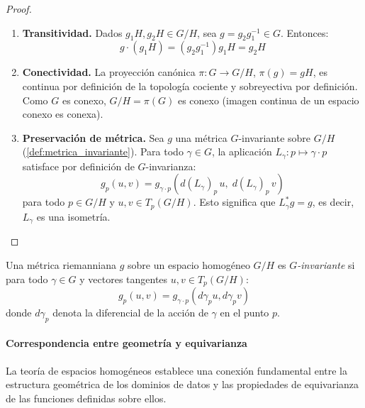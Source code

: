\begin{proof}
\leavevmode
\begin{enumerate}
    \item \textbf{Transitividad.} Dados $g_1H, g_2H \in G/H$, sea $g = g_2 g_1^{-1} \in G$. Entonces:
    \[
    g \cdot (g_1H) = (g_2 g_1^{-1}) g_1 H = g_2 H
    \]

    \item \textbf{Conectividad.} La proyección canónica $\pi: G \to G/H$, $\pi(g) = gH$, es continua por definición de la topología cociente y sobreyectiva por definición. Como $G$ es conexo, $G/H = \pi(G)$ es conexo (imagen continua de un espacio conexo es conexa).

    \item \textbf{Preservación de métrica.} Sea $g$ una métrica $G$-invariante sobre $G/H$ (\autoref{def:metrica_invariante}). Para todo $\gamma \in G$, la aplicación $L_\gamma: p \mapsto \gamma \cdot p$ satisface por definición de $G$-invarianza:
    \[
    g_p(u, v) = g_{\gamma \cdot p}(d(L_\gamma)_p\, u,\; d(L_\gamma)_p\, v)
    \]
    para todo $p \in G/H$ y $u, v \in T_p(G/H)$. Esto significa que $L_\gamma^* g = g$, es decir, $L_\gamma$ es una isometría. \qedhere
\end{enumerate}
\end{proof}

\begin{definition}\label{def:metrica_invariante}
Una métrica riemanniana $g$ sobre un espacio homogéneo $G/H$ es \textit{$G$-invariante} si para todo $\gamma \in G$ y vectores tangentes $u, v \in T_p(G/H)$:
\begin{equation}
g_p(u, v) = g_{\gamma \cdot p}(d\gamma_p u, d\gamma_p v)
\end{equation}
donde $d\gamma_p$ denota la diferencial de la acción de $\gamma$ en el punto $p$.
\end{definition}

\paragraph{Correspondencia entre geometría y equivarianza}

La teoría de espacios homogéneos establece una conexión fundamental entre la estructura geométrica de los dominios de datos y las propiedades de equivarianza de las funciones definidas sobre ellos.

